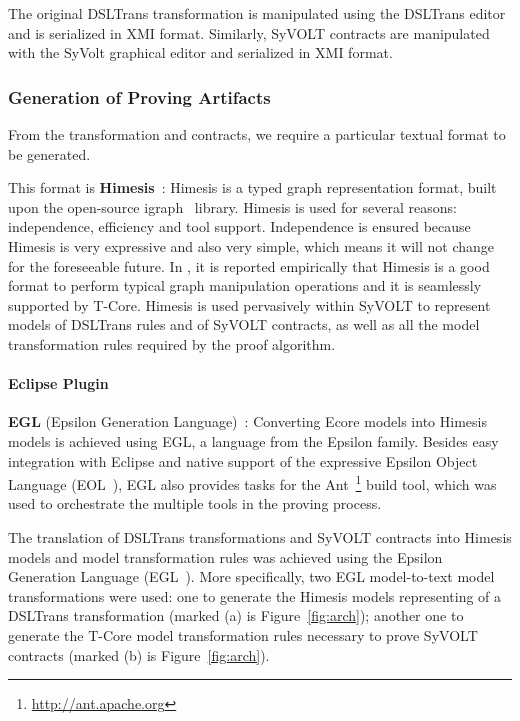  The original DSLTrans transformation is manipulated using the DSLTrans editor
  and is serialized in XMI format. Similarly, SyVOLT contracts are manipulated with the SyVolt graphical
  editor and serialized in XMI format.
  
  
\subsubsection{Generation of Proving Artifacts}

From the transformation and contracts, we require a particular textual format to be generated.

This format is \textbf{Himesis}~\cite{Provost2006}: Himesis is a typed graph representation
  format, built upon the open-source igraph~\cite{igraphTool} library. 
Himesis is used for several reasons: independence, efficiency and
tool support.
Independence is ensured because Himesis is very expressive and also
very simple, which means it will not change for the foreseeable
future.
In \cite{Syriani2010b}, it is reported empirically that Himesis is a good format to perform typical graph
manipulation operations and it is seamlessly supported by T-Core.
  Himesis is used pervasively within SyVOLT to represent models of 
  DSLTrans rules and of SyVOLT contracts, as well as all the model
  transformation rules required by the proof algorithm.




\paragraph{Eclipse Plugin}

\textbf{EGL} (Epsilon Generation Language)~\cite{eglTool}: Converting
  Ecore models into Himesis models is achieved using EGL, a language from the
  Epsilon family. Besides easy integration with Eclipse and native support of
  the expressive
Epsilon Object Language (EOL~\cite{Kolovos}), EGL also provides tasks for the
Ant~\footnote{\url{http://ant.apache.org}} build tool, which was used to
orchestrate the multiple tools in the proving process.

The translation of DSLTrans transformations and SyVOLT contracts into Himesis
models and model transformation rules was achieved using the Epsilon Generation
Language (EGL~\cite{Rose2008}). More specifically, two EGL model-to-text model
transformations were used: one to generate the Himesis models representing of a DSLTrans transformation (marked (a) is
Figure~\ref{fig:arch}); another one to generate the T-Core model transformation
rules necessary to prove SyVOLT contracts (marked (b) is Figure~\ref{fig:arch}).

